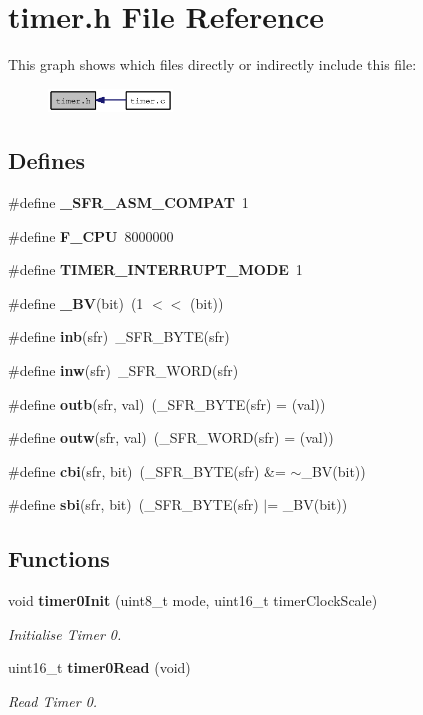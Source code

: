 \section{timer.h File Reference}
\label{timer_8h}


This graph shows which files directly or indirectly include this file:\nopagebreak
\begin{figure}[H]
\begin{center}
\leavevmode
\includegraphics[width=94pt]{timer_8h__dep__incl}
\end{center}
\end{figure}
\subsection*{Defines}
\begin{CompactItemize}
\item 
\#define {\bf \_\-SFR\_\-ASM\_\-COMPAT}~1
\item 
\#define {\bf F\_\-CPU}~8000000
\item 
\#define {\bf TIMER\_\-INTERRUPT\_\-MODE}~1
\item 
\#define {\bf \_\-BV}(bit)~(1 $<$$<$ (bit))
\item 
\#define {\bf inb}(sfr)~\_\-SFR\_\-BYTE(sfr)
\item 
\#define {\bf inw}(sfr)~\_\-SFR\_\-WORD(sfr)
\item 
\#define {\bf outb}(sfr, val)~(\_\-SFR\_\-BYTE(sfr) = (val))
\item 
\#define {\bf outw}(sfr, val)~(\_\-SFR\_\-WORD(sfr) = (val))
\item 
\#define {\bf cbi}(sfr, bit)~(\_\-SFR\_\-BYTE(sfr) \&= $\sim$\_\-BV(bit))
\item 
\#define {\bf sbi}(sfr, bit)~(\_\-SFR\_\-BYTE(sfr) $|$= \_\-BV(bit))
\end{CompactItemize}
\subsection*{Functions}
\begin{CompactItemize}
\item 
void {\bf timer0Init} (uint8\_\-t mode, uint16\_\-t timerClockScale)
\begin{CompactList}\small\item\em Initialise Timer 0. \item\end{CompactList}\item 
uint16\_\-t {\bf timer0Read} (void)
\begin{CompactList}\small\item\em Read Timer 0. \item\end{CompactList}\end{CompactItemize}


